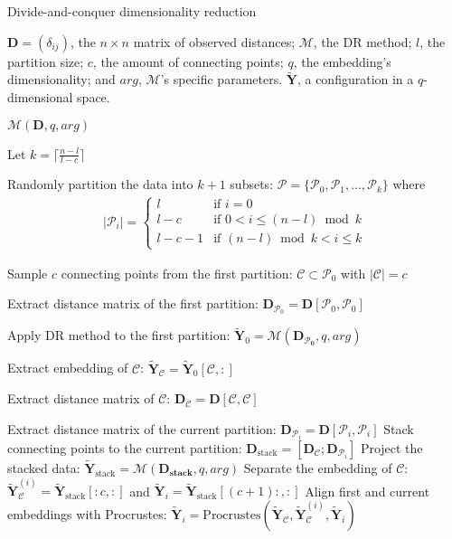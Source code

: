 \begin{algorithm}
    \caption{Divide-and-conquer dimensionality reduction}
    \label{alg:DivideConquer}
    
    \begin{algorithmic}[1]
    \REQUIRE $\mathbf{D} = (\delta_{ij})$, the $n \times n$ matrix of observed distances; $\mathcal{M}$, the DR method; $l$, the partition size; $c$, the amount of connecting points; $q$, the embedding's dimensionality; and $arg$, $\mathcal{M}$'s specific parameters.
    \ENSURE $\mathbf{\tilde{Y}}$, a configuration in a $q$-dimensional space.
    
        \RETURN $\mathcal{M}(\mathbf{D}, q, arg)$
    \ENDIF

    \STATE Let $k = \lceil \frac{n - l}{l - c} \rceil$
    
    \STATE Randomly partition the data into $k+1$ subsets: $\mathcal{P} = \{\mathcal{P}_0, \mathcal{P}_1, \ldots, \mathcal{P}_k\}$ where
    \begin{align*}
        |\mathcal{P}_i| = \begin{cases}
        l & \text{if } i = 0 \\
        l-c & \text{if } 0 < i \leq (n-l) \bmod k \\
        l-c-1 & \text{if } (n-l) \bmod k < i \leq k
        \end{cases}
    \end{align*}
    
    \STATE Sample $c$ connecting points from the first partition: $\mathcal{C} \subset \mathcal{P}_0$ with $|\mathcal{C}| = c$

    \STATE Extract distance matrix of the first partition: $\mathbf{D}_{\mathcal{P}_0} = \mathbf{D}[\mathcal{P}_0,\mathcal{P}_0]$
    
    \STATE Apply DR method to the first partition: $\mathbf{\tilde{Y}}_0 = \mathcal{M}(\mathbf{D_{\mathcal{P}_0}}, q, arg)$

    \STATE Extract embedding of $\mathcal{C}$: $\mathbf{\tilde{Y}}_\mathcal{C} = \mathbf{\tilde{Y}}_0[{\mathcal{C}},:]$

    \STATE Extract distance matrix of $\mathcal{C}$: $\mathbf{D}_{\mathcal{C}} = \mathbf{D}[\mathcal{C},\mathcal{C}]$
    
        \STATE Extract distance matrix of the current partition: $\mathbf{D}_{\mathcal{P}_i} = \mathbf{D}[\mathcal{P}_i,\mathcal{P}_i]$
        \STATE Stack connecting points to the current partition: $\mathbf{D}_{\text{stack}} = [\mathbf{D}_{\mathcal{C}}; \mathbf{D}_{\mathcal{P}_i}]$
        \STATE Project the stacked data: $\mathbf{\tilde{Y}}_{\text{stack}} = \mathcal{M}(\mathbf{D_{\text{stack}}}, q, arg)$
        \STATE Separate the embedding of $\mathcal{C}$: $\mathbf{\tilde{Y}}_{\mathcal{C}}^{(i)} = \mathbf{\tilde{Y}}_{\text{stack}}[:c,:]$ and $\mathbf{\tilde{Y}}_i = \mathbf{\tilde{Y}}_{\text{stack}}[(c+1):,:]$
        \STATE Align first and current embeddings with Procrustes: $\mathbf{\tilde{Y}}_i = \text{Procrustes}(\mathbf{\tilde{Y}}_\mathcal{C}, \mathbf{\tilde{Y}}_{\mathcal{C}}^{(i)}, \mathbf{\tilde{Y}}_i)$
    \ENDFOR
    

\end{algorithmic}
\end{algorithm}
